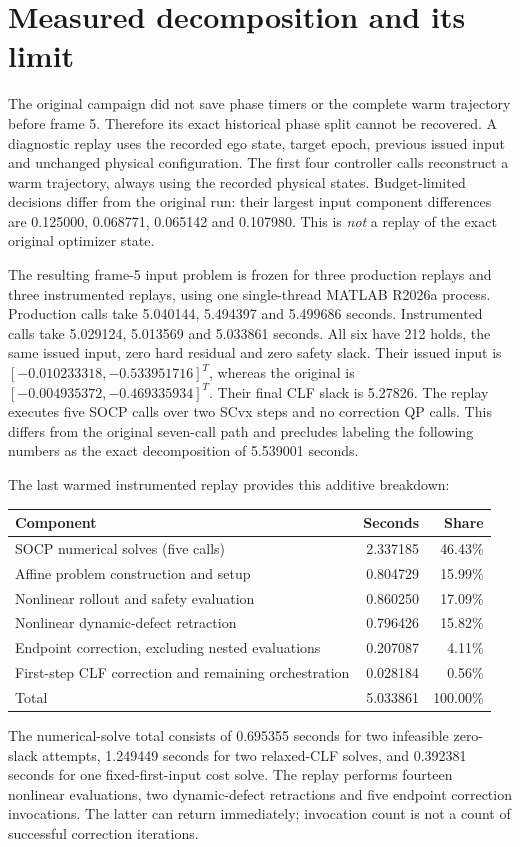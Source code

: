 \documentclass[11pt]{article}
\begin{document}
\section{Measured decomposition and its limit}
The original campaign did not save phase timers or the complete warm trajectory
before frame 5. Therefore its exact historical phase split cannot be recovered.
A diagnostic replay uses the recorded ego state, target epoch, previous issued
input and unchanged physical configuration. The first four controller calls
reconstruct a warm trajectory, always using the recorded physical states.
Budget-limited decisions differ from the original run: their largest input
component differences are 0.125000, 0.068771, 0.065142 and 0.107980. This is
\emph{not} a replay of the exact original optimizer state.

The resulting frame-5 input problem is frozen for three production replays
and three instrumented replays, using one single-thread MATLAB R2026a process.
Production calls take 5.040144, 5.494397 and 5.499686 seconds. Instrumented calls
take 5.029124, 5.013569 and 5.033861 seconds. All six have 212 holds, the same
issued input, zero hard residual and zero safety slack. Their issued input is
$[-0.010233318,-0.533951716]^T$, whereas the original is
$[-0.004935372,-0.469335934]^T$. Their final CLF slack is 5.27826.
The replay executes five SOCP calls over two SCvx steps and no correction QP
calls. This differs from the original seven-call path and precludes labeling
the following numbers as the exact decomposition of 5.539001 seconds.

The last warmed instrumented replay provides this additive breakdown:
\begin{center}
\begin{tabular}{lrr}
\toprule
Component & Seconds & Share \\
\midrule
SOCP numerical solves (five calls) & 2.337185 & 46.43\% \\
Affine problem construction and setup & 0.804729 & 15.99\% \\
Nonlinear rollout and safety evaluation & 0.860250 & 17.09\% \\
Nonlinear dynamic-defect retraction & 0.796426 & 15.82\% \\
Endpoint correction, excluding nested evaluations & 0.207087 & 4.11\% \\
First-step CLF correction and remaining orchestration & 0.028184 & 0.56\% \\
\midrule
Total & 5.033861 & 100.00\% \\
\bottomrule
\end{tabular}
\end{center}
The numerical-solve total consists of 0.695355 seconds for two infeasible
zero-slack attempts, 1.249449 seconds for two relaxed-CLF solves, and 0.392381
seconds for one fixed-first-input cost solve. The replay performs fourteen
nonlinear evaluations, two dynamic-defect retractions and five endpoint
correction invocations. The latter can return immediately; invocation count
is not a count of successful correction iterations.
\end{document}
